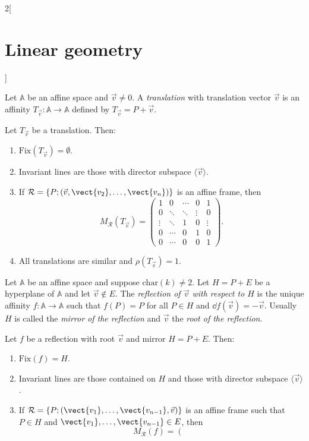 \documentclass[../../../main.tex]{subfiles}
\begin{document}
\begin{multicols}{2}[\section{Linear geometry}]
\begin{definition}[Translations]
Let $\mathbb{A}$ be an affine space and $\vec{v}\ne 0$. A \textit{translation} with translation vector $\vec{v}$ is an affinity $T_{\vec{v}}:\mathbb{A}\rightarrow\mathbb{A}$ defined by $T_{\vec{v}}=P+\vec{v}$.
\end{definition}
\begin{prop}
Let $T_{\vec{v}}$ be a translation. Then:
\begin{enumerate}
    \item $\text{Fix}(T_{\vec{v}})=\emptyset$.
    \item Invariant lines are those with director subspace $\langle\vec{v}\rangle$.
    \item If $\mathcal{R}=\{P;(\vec{v},\vect{v_2},\ldots,\vect{v_n})\}$ is an affine frame, then $$M_\mathcal{R}(T_{\vec{v}})=\left(\begin{array}{cccc|c}
        1 & 0 & \cdots & 0 & 1\\
        0 & \ddots & \ddots & \vdots  & 0\\
        \vdots & \ddots & 1 & 0 & \vdots\\
        0 & \cdots & 0 & 1 & 0\\
        \hline
        0 & \cdots & 0 & 0 &  1
    \end{array}\right).$$
    \item All translations are similar and $\rho(T_{\vec{v}})=1$.
\end{enumerate}
\end{prop}
\begin{definition}[Reflections]
Let $\mathbb{A}$ be an affine space and suppose $\text{char}(k)\ne 2$. Let $H=P+E$ be a hyperplane of $\mathbb{A}$ and let $\vec{v}\notin E$. The \textit{reflection of $\vec{v}$ with respect to $H$} is the unique affinity $f:\mathbb{A}\rightarrow\mathbb{A}$ such that $f(P)=P$ for all $P\in H$ and $\dd f(\vec{v})=-\vec{v}$. Usually $H$ is called the \textit{mirror of the reflection} and $\vec{v}$ the \textit{root of the reflection}.
\end{definition}
\begin{prop}
Let $f$ be a reflection with root $\vec{v}$ and mirror $H=P+E$. Then:
\begin{enumerate}
    \item $\text{Fix}(f)=H$.
    \item Invariant lines are those contained on $H$ and those with director subspace $\langle\vec{v}\rangle$.
    \item If $\mathcal{R}=\{P;(\vect{v_1},\ldots,\vect{v_{n-1}},\vec{v})\}$ is  an affine frame such that $P\in H$ and $\vect{v_1},\ldots,\vect{v_{n-1}}\in E$, then $$M_\mathcal{R}(f)=\left(\begin{array}{cccc|c}

\end{array}$$
\end{enumerate}
\end{prop}
\end{multicols}
\end{document}

